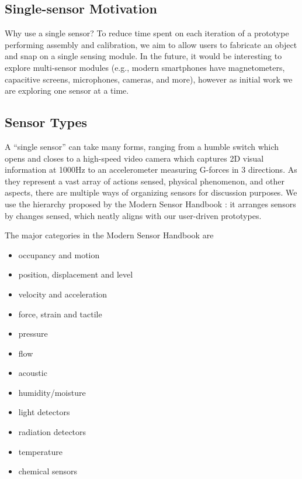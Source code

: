 \subsection{Single-sensor Motivation}

Why use a single sensor? To reduce time spent on each iteration of a prototype performing assembly and calibration, we aim to allow users to fabricate an object and snap on a single sensing module. In the future, it would be interesting to explore multi-sensor modules (e.g., modern smartphones have magnetometers, capacitive screens, microphones, cameras, and more), however as initial work we are exploring one sensor at a time.

\subsection{Sensor Types}

A ``single sensor'' can take many forms, ranging from a humble switch which opens and closes to a high-speed video camera which captures 2D visual information at 1000Hz to an accelerometer measuring G-forces in 3 directions.
As they represent a vast array of actions sensed, physical phenomenon, and other aspects, there are multiple ways of organizing sensors for discussion purposes. We use the hierarchy proposed by the Modern Sensor Handbook \cite{fraden-modernsensors}: it arranges sensors by changes sensed, which neatly aligns with our user-driven prototypes.

The major categories in the Modern Sensor Handbook are
\begin{itemize}
    \item occupancy and motion
    \item position, displacement and level
    \item velocity and acceleration
    \item force, strain and tactile
    \item pressure
    \item flow
    \item acoustic
    \item humidity/moisture
    \item light detectors
    \item radiation detectors
    \item temperature
    \item chemical sensors
\end{itemize}


